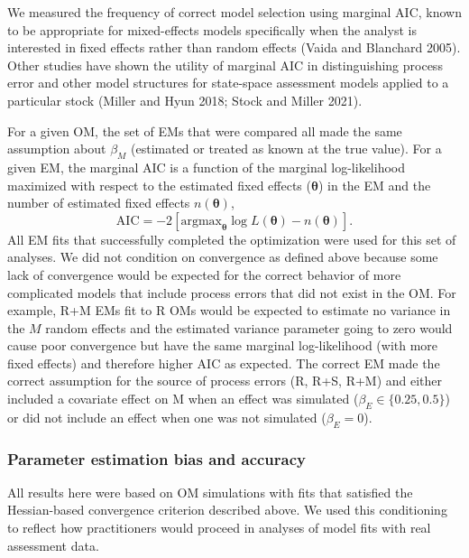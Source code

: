 \documentclass[
  12pt,
]{article}
\begin{document}
We measured the frequency of correct model selection using marginal AIC,
known to be appropriate for mixed-effects models specifically when the
analyst is interested in fixed effects rather than random effects (Vaida
and Blanchard 2005). Other studies have shown the utility of marginal
AIC in distinguishing process error and other model structures for
state-space assessment models applied to a particular stock (Miller and
Hyun 2018; Stock and Miller 2021).

For a given OM, the set of EMs that were compared all made the same
assumption about \(\beta_M\) (estimated or treated as known at the true
value). For a given EM, the marginal AIC is a function of the marginal
log-likelihood maximized with respect to the estimated fixed effects
(\(\boldsymbol{\theta}\)) in the EM and the number of estimated fixed
effects \(n\left(\boldsymbol{\theta}\right)\), \[
\text{AIC} = -2\left[{\text{argmax}}_{\boldsymbol{\theta}} \log L\left({\boldsymbol{\theta}}\right) - n\left({\boldsymbol{\theta}}\right)\right].
\] All EM fits that successfully completed the optimization were used
for this set of analyses. We did not condition on convergence as defined
above because some lack of convergence would be expected for the correct
behavior of more complicated models that include process errors that did
not exist in the OM. For example, R+M EMs fit to R OMs would be expected
to estimate no variance in the \(M\) random effects and the estimated
variance parameter going to zero would cause poor convergence but have
the same marginal log-likelihood (with more fixed effects) and therefore
higher AIC as expected. The correct EM made the correct assumption for
the source of process errors (R, R+S, R+M) and either included a
covariate effect on M when an effect was simulated
(\(\beta_E \in \{0.25,0.5\}\)) or did not include an effect when one was
not simulated (\(\beta_E = 0\)).

\subsubsection*{Parameter estimation bias and
accuracy}\label{parameter-estimation-bias-and-accuracy}

All results here were based on OM simulations with fits that satisfied
the Hessian-based convergence criterion described above. We used this
conditioning to reflect how practitioners would proceed in analyses of
model fits with real assessment data.
\end{document}
